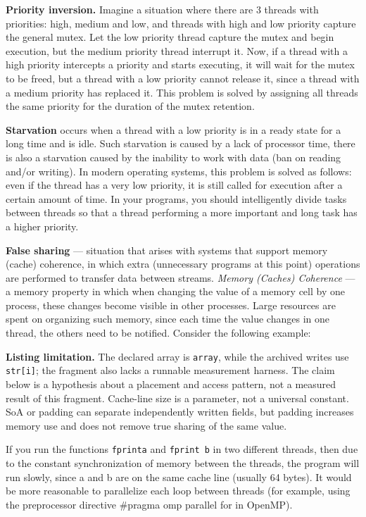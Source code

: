 {	\par\textbf{Priority inversion.} Imagine a situation where there are 3 threads with priorities: high, medium and low, and threads with high and low priority capture the general mutex. Let the low priority thread capture the mutex and begin execution, but the medium priority thread interrupt it. Now, if a thread with a high priority intercepts a priority and starts executing, it will wait for the mutex to be freed, but a thread with a low priority cannot release it, since a thread with a medium priority has replaced it. This problem is solved by assigning all threads the same priority for the duration of the mutex retention.
	\par\textbf{Starvation} occurs when a thread with a low priority is in a ready state for a long time and is idle. Such starvation is caused by a lack of processor time, there is also a starvation caused by the inability to work with data (ban on reading and/or writing). In modern operating systems, this problem is solved as follows: even if the thread has a very low priority, it is still called for execution after a certain amount of time. In your programs, you should intelligently divide tasks between threads so that a thread performing a more important and long task has a higher priority.
	\par\textbf{False sharing} ---  situation that arises with systems that support memory (cache) coherence, in which extra (unnecessary programs at this point) operations are performed to transfer data between streams. \textit{Memory (Caches) Coherence} --- a memory property in which when changing the value of a memory cell by one process, these changes become visible in other processes. Large resources are spent on organizing such memory, since each time the value changes in one thread, the others need to be notified. Consider the following example:
	\begin{figure}[H]
		
	\end{figure}
	\par\textbf{Listing limitation.} The declared array is \texttt{array}, while the archived writes use \texttt{str[i]}; the fragment also lacks a runnable measurement harness. The claim below is a hypothesis about a placement and access pattern, not a measured result of this fragment. Cache-line size is a parameter, not a universal constant. SoA or padding can separate independently written fields, but padding increases memory use and does not remove true sharing of the same value.
	\par If you run the functions \texttt{fprint\textunderscore a} and \texttt{fprint \textunderscore b} in two different threads, then due to the constant synchronization of memory between the threads, the program will run slowly, since a and b are on the same cache line (usually 64 bytes). It would be more reasonable to parallelize each loop between threads (for example, using the preprocessor directive  \#pragma omp parallel for in OpenMP).
}